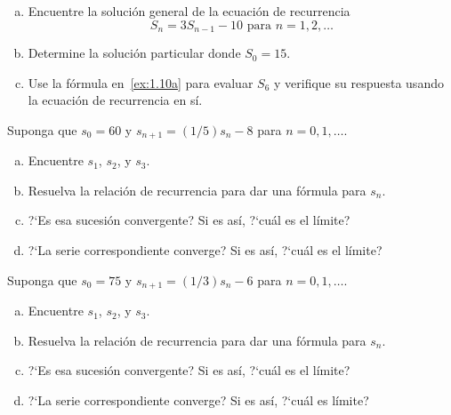 \begin{exercise}
\begin{enumerate}[(a)]
	\item Encuentre la solución general de la ecuación de recurrencia \[ S_{n}=3S_{n-1}-10\text{ para }n=1,2,\ldots \]\label{ex:1.10a}
	\item Determine la solución particular donde $S_{0}=15$.
	\item Use la fórmula en~\eqref{ex:1.10a} para evaluar $S_6$ y verifique su respuesta usando la ecuación de recurrencia en sí.
\end{enumerate}
\end{exercise}

\begin{solution}
	
\end{solution}

\begin{exercise}
Suponga que $s_{0}=60$ y $s_{n+1}=(1/5)s_n-8$ para $n=0,1,\ldots$.
\begin{enumerate}[(a)]
	\item Encuentre $s_{1}$, $s_{2}$, y $s_{3}$.
	\item Resuelva la relación de recurrencia para dar una fórmula para $s_{n}$.
	\item ?`Es esa sucesión convergente? Si es así, ?`cuál es el límite?
	\item ?`La serie correspondiente converge? Si es así, ?`cuál es el límite?
\end{enumerate}
\end{exercise}

\begin{solution}
	
\end{solution}

\begin{exercise}
Suponga que $s_{0}=75$ y $s_{n+1}=(1/3)s_{n}-6$ para $n=0,1,\ldots$.
\begin{enumerate}[(a)]
	\item Encuentre $s_{1}$, $s_{2}$, y $s_{3}$.
	\item Resuelva la relación de recurrencia para dar una fórmula para $s_{n}$.
	\item ?`Es esa sucesión convergente? Si es así, ?`cuál es el límite?
	\item ?`La serie correspondiente converge? Si es así, ?`cuál es límite?
\end{enumerate}
\end{exercise}

